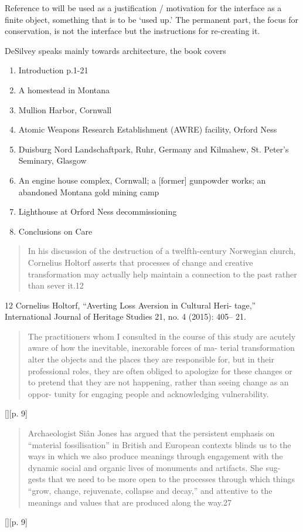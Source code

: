Reference to \cite{desilvey_curated_2017} will be used as a justification /
motivation for the interface as a finite object, something that is to be `used
up.' The permanent part, the focus for conservation, is not the interface but
the instructions for re-creating it.

DeSilvey speaks mainly towards architecture, the book covers

\begin{enumerate}
    \item Introduction p.1-21
    \item A homestead in Montana
    \item Mullion Harbor, Cornwall
    \item Atomic Weapons Research Establishment (AWRE) facility, Orford Ness
    \item Duisburg Nord Landschaftpark, Ruhr, Germany and Kilmahew, St. Peter’s
    Seminary, Glasgow
    \item An engine house complex, Cornwall; a [former] gunpowder works; an
    abandoned Montana gold mining camp
    \item Lighthouse at Orford Ness decommissioning
    \item Conclusions on Care
\end{enumerate}

\begin{quotation}
    In his discussion of the destruction of a twelfth-century Norwegian church,
    Cornelius Holtorf asserts that processes of change and creative
    transformation may actually help maintain a connection to the past rather
    than sever it.12
\end{quotation}

12 Cornelius Holtorf, “Averting Loss Aversion in Cultural Heri- tage,”
International Journal of Heritage Studies 21, no. 4 (2015): 405– 21.

\begin{quotation}
    The practitioners whom I consulted in the course of this study are acutely
    aware of how the inevitable, inexorable forces of ma- terial transformation
    alter the objects and the places they are responsible for, but in their
    professional roles, they are often obliged to apologize for these changes or
    to pretend that they are not happening, rather than seeing change as an
    oppor- tunity for engaging people and acknowledging vulnerability.
\end{quotation}[][p. 9]

\begin{quotation}
    Archaeologist Siân Jones has argued that the persistent emphasis on
    “material fossilisation” in British and European contexts blinds us to the
    ways in which we also produce meanings through engagement with the dynamic
    social and organic lives of monuments and artifacts. She sug- gests that we
    need to be more open to the processes through which things “grow, change,
    rejuvenate, collapse and decay,” and attentive to the meanings and values
    that are produced along the way.27
\end{quotation}[][p. 9]

